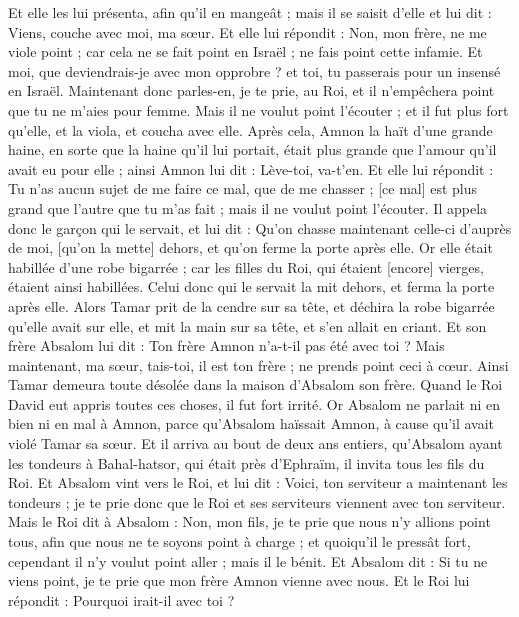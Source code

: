 \begin{multicols}{2}
Et elle les lui présenta, afin qu'il en mangeât ; mais il se saisit d'elle et lui dit : Viens, couche avec moi, ma sœur.
Et elle lui répondit : Non, mon frère, ne me viole point ; car cela ne se fait point en Israël ; ne fais point cette infamie.
Et moi, que deviendrais-je avec mon opprobre ? et toi, tu passerais pour un insensé en Israël. Maintenant donc parles-en, je te prie, au Roi, et il n'empêchera point que tu ne m'aies pour femme.
Mais il ne voulut point l'écouter ; et il fut plus fort qu'elle, et la viola, et coucha avec elle.
Après cela, Amnon la haït d'une grande haine, en sorte que la haine qu'il lui portait, était plus grande que l'amour qu'il avait eu pour elle ; ainsi Amnon lui dit : Lève-toi, va-t'en.
Et elle lui répondit : Tu n'as aucun sujet de me faire ce mal, que de me chasser ; [ce mal] est plus grand que l'autre que tu m'as fait ; mais il ne voulut point l'écouter.
Il appela donc le garçon qui le servait, et lui dit : Qu'on chasse maintenant celle-ci d'auprès de moi, [qu'on la mette] dehors, et qu'on ferme la porte après elle.
Or elle était habillée d'une robe bigarrée ; car les filles du Roi, qui étaient [encore] vierges, étaient ainsi habillées. Celui donc qui le servait la mit dehors, et ferma la porte après elle.
Alors Tamar prit de la cendre sur sa tête, et déchira la robe bigarrée qu'elle avait sur elle, et mit la main sur sa tête, et s'en allait en criant.
Et son frère Absalom lui dit : Ton frère Amnon n'a-t-il pas été avec toi ? Mais maintenant, ma sœur, tais-toi, il est ton frère ; ne prends point ceci à cœur. Ainsi Tamar demeura toute désolée dans la maison d'Absalom son frère.
Quand le Roi David eut appris toutes ces choses, il fut fort irrité.
Or Absalom ne parlait ni en bien ni en mal à Amnon, parce qu'Absalom haïssait Amnon, à cause qu'il avait violé Tamar sa sœur.
Et il arriva au bout de deux ans entiers, qu'Absalom ayant les tondeurs à Bahal-hatsor, qui était près d'Ephraïm, il invita tous les fils du Roi.
Et Absalom vint vers le Roi, et lui dit : Voici, ton serviteur a maintenant les tondeurs ; je te prie donc que le Roi et ses serviteurs viennent avec ton serviteur.
Mais le Roi dit à Absalom : Non, mon fils, je te prie que nous n'y allions point tous, afin que nous ne te soyons point à charge ; et quoiqu'il le pressât fort, cependant il n'y voulut point aller ; mais il le bénit.
Et Absalom dit : Si tu ne viens point, je te prie que mon frère Amnon vienne avec nous. Et le Roi lui répondit : Pourquoi irait-il avec toi ?

\end{multicols}
